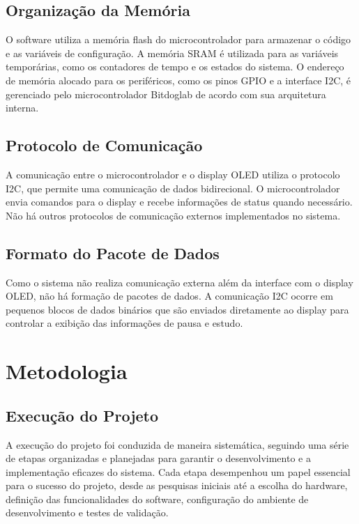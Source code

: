 \documentclass{article}
\begin{document}
\subsection{Organização da Memória}
O software utiliza a memória flash do microcontrolador para armazenar o código e as variáveis de configuração. A memória SRAM é utilizada para as variáveis temporárias, como os contadores de tempo e os estados do sistema. O endereço de memória alocado para os periféricos, como os pinos GPIO e a interface I2C, é gerenciado pelo microcontrolador Bitdoglab de acordo com sua arquitetura interna.

\subsection{Protocolo de Comunicação}
A comunicação entre o microcontrolador e o display OLED utiliza o protocolo I2C, que permite uma comunicação de dados bidirecional. O microcontrolador envia comandos para o display e recebe informações de status quando necessário. Não há outros protocolos de comunicação externos implementados no sistema.

\subsection{Formato do Pacote de Dados}
Como o sistema não realiza comunicação externa além da interface com o display OLED, não há formação de pacotes de dados. A comunicação I2C ocorre em pequenos blocos de dados binários que são enviados diretamente ao display para controlar a exibição das informações de pausa e estudo.

\section{Metodologia}

\subsection{Execução do Projeto}

A execução do projeto foi conduzida de maneira sistemática, seguindo uma série de etapas organizadas e planejadas para garantir o desenvolvimento e a implementação eficazes do sistema. Cada etapa desempenhou um papel essencial para o sucesso do projeto, desde as pesquisas iniciais até a escolha do hardware, definição das funcionalidades do software, configuração do ambiente de desenvolvimento e testes de validação.
\end{document}

